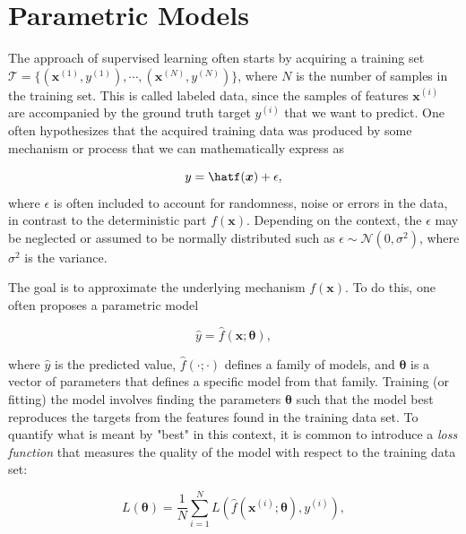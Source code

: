 \section{Parametric Models}\label{sec:ParametricModels}
The approach of supervised learning often starts by acquiring a training set $\mathcal{T} = \{(\boldsymbol{x}^{(1)}, y^{(1)}), \cdots, (\boldsymbol{x}^{(N)}, y^{(N)})\}$, where $N$ is the number of samples in the training set. This is called labeled data, since the samples of features $\boldsymbol{x}^{(i)}$ are accompanied by the ground truth target $y^{(i)}$  that we want to predict. One often hypothesizes that the acquired training data was produced by some mechanism or process that we can mathematically express as

\begin{equation}\label{eq:data}
    y = \hatf(\boldsymbol{x}) + \epsilon,
\end{equation}
where $\epsilon$ is often included to account for randomness, noise or errors in the data, in contrast to the deterministic part $f(\boldsymbol{x})$. Depending on the context, the $\epsilon$ may be neglected or assumed to be normally distributed such as $\epsilon \sim \mathcal{N}(0, \sigma^2)$, where $\sigma^2$ is the variance.

The goal is to approximate the underlying mechanism $f(\boldsymbol{x})$. To do this, one often proposes a parametric model

\begin{equation*}
    \hat{y} = \hat{f}(\boldsymbol{x}; \boldsymbol{\theta}),
\end{equation*}

where $\hat{y}$ is the predicted value, $\hat{f}(\cdot; \cdot)$ defines a family of models, and $\boldsymbol{\theta}$ is a vector of parameters that defines a specific model from that family. Training (or fitting) the model involves finding the parameters $\boldsymbol{\theta}$ such that the model best reproduces the targets from the features found in the training data set. To quantify what is meant by "best" in this context, it is common to introduce a \emph{loss function} that measures the quality of the model with respect to the training data set:

\begin{equation}\label{eq:LossFunction}
    L(\boldsymbol{\theta}) = \frac{1}{N}\sum_{i=1}^{N} L(\hat{f}(\boldsymbol{x}^{(i)}; \boldsymbol{\theta}) , y^{(i)}),
\end{equation}

